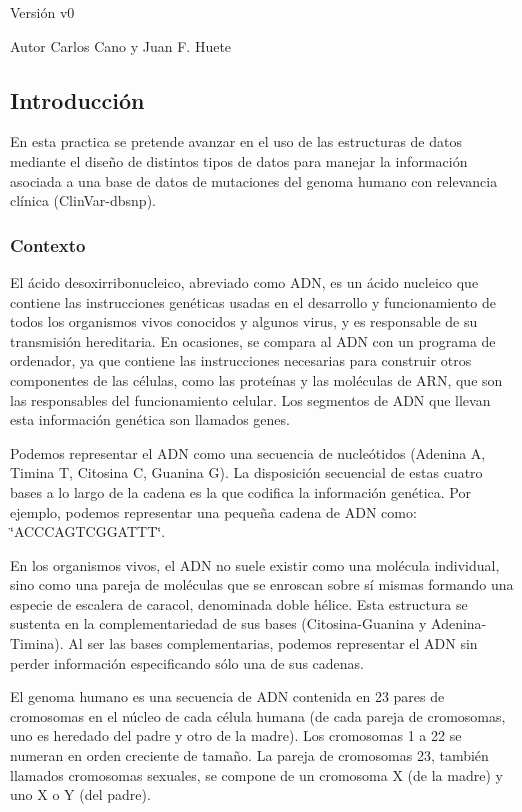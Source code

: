 \begin{DoxyVersion}{Versión}
v0 
\end{DoxyVersion}
\begin{DoxyAuthor}{Autor}
Carlos Cano y Juan F. Huete
\end{DoxyAuthor}
\hypertarget{index_introsec}{}\subsection{Introducción}\label{index_introsec}
En esta practica se pretende avanzar en el uso de las estructuras de datos mediante el diseño de distintos tipos de datos para manejar la información asociada a una base de datos de mutaciones del genoma humano con relevancia clínica (Clin\-Var-\/dbsnp).\hypertarget{index_background}{}\subsubsection{Contexto}\label{index_background}
El ácido desoxirribonucleico, abreviado como A\-D\-N, es un ácido nucleico que contiene las instrucciones genéticas usadas en el desarrollo y funcionamiento de todos los organismos vivos conocidos y algunos virus, y es responsable de su transmisión hereditaria. En ocasiones, se compara al A\-D\-N con un programa de ordenador, ya que contiene las instrucciones necesarias para construir otros componentes de las células, como las proteínas y las moléculas de A\-R\-N, que son las responsables del funcionamiento celular. Los segmentos de A\-D\-N que llevan esta información genética son llamados genes.

Podemos representar el A\-D\-N como una secuencia de nucleótidos (Adenina A, Timina T, Citosina C, Guanina G). La disposición secuencial de estas cuatro bases a lo largo de la cadena es la que codifica la información genética. Por ejemplo, podemos representar una pequeña cadena de A\-D\-N como\-: \char`\"{}\-A\-C\-C\-C\-A\-G\-T\-C\-G\-G\-A\-T\-T\-T\char`\"{}.

En los organismos vivos, el A\-D\-N no suele existir como una molécula individual, sino como una pareja de moléculas que se enroscan sobre sí mismas formando una especie de escalera de caracol, denominada doble hélice. Esta estructura se sustenta en la complementariedad de sus bases (Citosina-\/\-Guanina y Adenina-\/\-Timina). Al ser las bases complementarias, podemos representar el A\-D\-N sin perder información especificando sólo una de sus cadenas.

El genoma humano es una secuencia de A\-D\-N contenida en 23 pares de cromosomas en el núcleo de cada célula humana (de cada pareja de cromosomas, uno es heredado del padre y otro de la madre). Los cromosomas 1 a 22 se numeran en orden creciente de tamaño. La pareja de cromosomas 23, también llamados cromosomas sexuales, se compone de un cromosoma X (de la madre) y uno X o Y (del padre).


